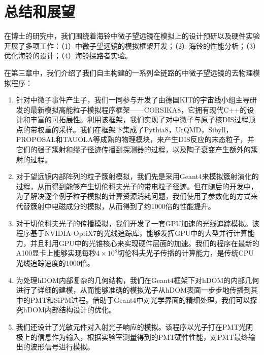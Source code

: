 \chapter{总结和展望}
\label{chap:conclusion}

在博士的研究中，我们围绕着海铃中微子望远镜在模拟上的设计预研以及硬件实验开展了多项工作：（1）中微子望远镜的模拟框架开发；（2）海铃的性能分析；（3）优化海铃的设计；（4）海铃探路者实验。

在第三章中，我们介绍了我们自主构建的一系列全链路的中微子望远镜的去物理模拟程序：
\begin{enumerate}
    \item 针对中微子事件产生子，我们一同参与开发了由德国KIT的宇宙线小组主导研发的最新模拟高能粒子模拟程序框架——CORSIKA8，它拥有现代C++的设计和丰富的可拓展性。利用该框架，我们实现了对中微子与原子核DIS过程顶点的带权重的采样。我们在框架下集成了\textsf{Pythia8}，\textsf{UrQMD}，\textsf{Sibyll}，\textsf{PROPOSAL}和\textsf{TAUOLA}等成熟的物理模块，来产生DIS反应的末态粒子，并它们的强子簇射和缪子径迹传播到探测器的过程，以及陶子衰变产生额外的簇射的过程。
    \item 对于望远镜内部阵列的粒子簇射模拟，我们先是采用\textsf{Geant4}来模拟簇射演化的过程，从而得到能够产生切伦科夫光子的带电粒子径迹。但在随后的开发中，为了解决逐个例子粒子模拟的计算资源消耗问题，我们使用了参数化的方式来代替簇射中电磁成分的模拟，从而得到了约1000倍的性能提升。
    \item 对于切伦科夫光子的传播模拟，我们开发了一套GPU加速的光线追踪模拟。该程序基于\textsf{NVIDIA-OptiX7}的光线追踪库，能够发挥GPU中的大型并行计算能力，并且利用GPU中的光锥核心来实现硬件层面的加速。我们的程序在最新的A100显卡上能够实现每秒$4\times10^8$切伦科夫光子传播的计算能力，是传统CPU光线追踪速度的1000倍。
    \item 为处理hDOM内部复杂的几何结构，我们在\textsf{Geant4}框架下对hDOM的内部几何进行了详细的建模，从而能够准确的模拟光子从hDOM表面一步步地传播到其中的PMT和SiPM过程。借助于\textsf{Geant4}中对光学界面的精细处理，我们可以探究hDOM内部结构设计的优化。
    \item 我们还设计了光敏元件对入射光子响应的模拟。该程序以光子打在PMT光阴极上的信息作为输入，根据实验室测量得到的PMT硬件性能，对PMT最终输出的波形信号进行模拟。
\end{enumerate}

